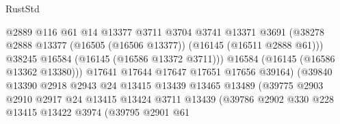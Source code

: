 \begin{lexlean}{RustStd}
\begin{coremodule}
                                          @2889
                                          @116
                                          @61
                                          @14
                                          @13377
                                          @3711
                                          @3704
                                          @3741
                                          @13371
                                          @3691
                                          (@38278
                                            @2888
                                            @13377
                                            (@16505 (@16506 @13377))
                                            (@16145 (@16511 @2888 @61)))
                                          @38245
                                          @16584
                                          (@16145 (@16586 @13372 @3711)))
                                        @16584
                                        (@16145 (@16586 @13362 @13380)))
                                      @17641
                                      @17644
                                      @17647
                                      @17651
                                      @17656
                                      @39164)
                                    (@39840
                                      @13390
                                      @2918
                                      @2943
                                      @24
                                      @13415
                                      @13439
                                      @13465
                                      @13489
                                      (@39775
                                        @2903
                                        @2910
                                        @2917
                                        @24
                                        @13415
                                        @13424
                                        @3711
                                        @13439
                                        (@39786
                                          @2902
                                          @330
                                          @228
                                          @13415
                                          @13422
                                          @3974
                                          (@39795
                                            @2901
                                            @61

\end{coremodule}
\end{lexlean}
